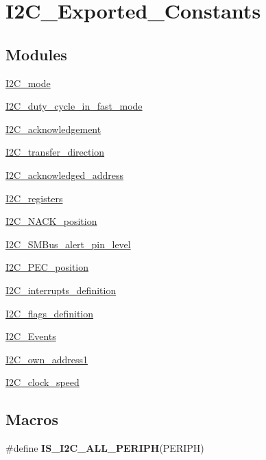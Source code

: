 \hypertarget{group___i2_c___exported___constants}{}\section{I2\+C\+\_\+\+Exported\+\_\+\+Constants}
\label{group___i2_c___exported___constants}
\subsection*{Modules}
\begin{DoxyCompactItemize}
\item 
\hyperlink{group___i2_c__mode}{I2\+C\+\_\+mode}
\item 
\hyperlink{group___i2_c__duty__cycle__in__fast__mode}{I2\+C\+\_\+duty\+\_\+cycle\+\_\+in\+\_\+fast\+\_\+mode}
\item 
\hyperlink{group___i2_c__acknowledgement}{I2\+C\+\_\+acknowledgement}
\item 
\hyperlink{group___i2_c__transfer__direction}{I2\+C\+\_\+transfer\+\_\+direction}
\item 
\hyperlink{group___i2_c__acknowledged__address}{I2\+C\+\_\+acknowledged\+\_\+address}
\item 
\hyperlink{group___i2_c__registers}{I2\+C\+\_\+registers}
\item 
\hyperlink{group___i2_c___n_a_c_k__position}{I2\+C\+\_\+\+N\+A\+C\+K\+\_\+position}
\item 
\hyperlink{group___i2_c___s_m_bus__alert__pin__level}{I2\+C\+\_\+\+S\+M\+Bus\+\_\+alert\+\_\+pin\+\_\+level}
\item 
\hyperlink{group___i2_c___p_e_c__position}{I2\+C\+\_\+\+P\+E\+C\+\_\+position}
\item 
\hyperlink{group___i2_c__interrupts__definition}{I2\+C\+\_\+interrupts\+\_\+definition}
\item 
\hyperlink{group___i2_c__flags__definition}{I2\+C\+\_\+flags\+\_\+definition}
\item 
\hyperlink{group___i2_c___events}{I2\+C\+\_\+\+Events}
\item 
\hyperlink{group___i2_c__own__address1}{I2\+C\+\_\+own\+\_\+address1}
\item 
\hyperlink{group___i2_c__clock__speed}{I2\+C\+\_\+clock\+\_\+speed}
\end{DoxyCompactItemize}
\subsection*{Macros}
\begin{DoxyCompactItemize}
\item 
\#define {\bfseries I\+S\+\_\+\+I2\+C\+\_\+\+A\+L\+L\+\_\+\+P\+E\+R\+I\+P\+H}(P\+E\+R\+I\+P\+H)
\end{DoxyCompactItemize}


